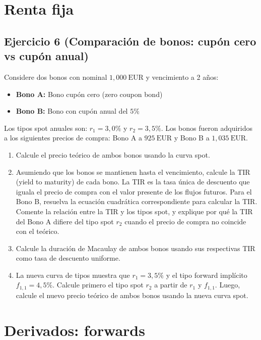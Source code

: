 \documentclass[12pt,a4paper]{article}
\newcommand{\EUR}[1]{\ensuremath{#1~\text{EUR}}}
\newenvironment{ejercicio}[1]{\subsection*{Ejercicio #1}}{}
\begin{document}
\section{Renta fija}

\begin{ejercicio}{6 (Comparación de bonos: cupón cero vs cupón anual)}
Considere dos bonos con nominal \EUR{1{,}000} y vencimiento a 2 años:
\begin{itemize}
   \item \textbf{Bono A:} Bono cupón cero (zero coupon bond)
   \item \textbf{Bono B:} Bono con cupón anual del \(5\%\)
\end{itemize}
Los tipos spot anuales son: \(r_1=3{,}0\%\) y \(r_2=3{,}5\%\). Los bonos fueron adquiridos a los siguientes precios de compra: Bono A a \EUR{925} y Bono B a \EUR{1{,}035}.
\begin{enumerate}[label=\alph*)]
   \item Calcule el precio teórico de ambos bonos usando la curva spot.
  \item Asumiendo que los bonos se mantienen hasta el vencimiento, calcule la TIR (yield to maturity) de cada bono. La TIR es la tasa única de descuento que iguala el precio de compra con el valor presente de los flujos futuros. Para el Bono B, resuelva la ecuación cuadrática correspondiente para calcular la TIR. Comente la relación entre la TIR y los tipos spot, y explique por qué la TIR del Bono A difiere del tipo spot \(r_2\) cuando el precio de compra no coincide con el teórico.
   \item Calcule la duración de Macaulay de ambos bonos usando sus respectivas TIR como tasa de descuento uniforme.
   \item La nueva curva de tipos muestra que \(r_1 = 3{,}5\%\) y el tipo forward implícito \(f_{1,1} = 4{,}5\%\). Calcule primero el tipo spot \(r_2\) a partir de \(r_1\) y \(f_{1,1}\). Luego, calcule el nuevo precio teórico de ambos bonos usando la nueva curva spot.
\end{enumerate}
\end{ejercicio}

\section{Derivados: forwards}
\end{document}
